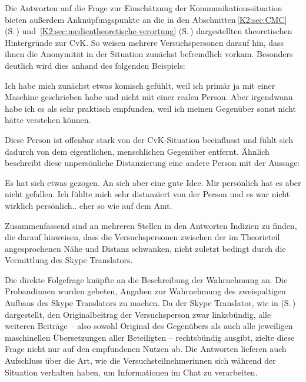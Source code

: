 Die Antworten auf die Frage zur Einschätzung der Kommunikationssituation bieten außerdem Anknüpfungspunkte an die in den Abschnitten\,\ref{K2:sec:CMC} (S.\,\pageref{K2:sec:CMC}) und~\ref{K2:sec:medientheoretische-verortung} (S.\,\pageref{K2:sec:medientheoretische-verortung}) dargestellten theoretischen Hintergründe zur CvK. So weisen mehrere Versuchspersonen darauf hin, dass ihnen die Anonymität in der Situation zunächst befremdlich vorkam. Besonders deutlich wird dies anhand des folgenden Beispiels: 

\begin{example}
	\label{K6:exp:CvK:maschine}
    Ich habe mich zunächst etwas komisch gefühlt, weil ich primär ja mit einer Maschine geschrieben habe und nicht mit einer realen Person. Aber irgendwann habe ich es als sehr praktisch empfunden, weil ich meinen Gegenüber sonst nicht hätte verstehen können.
\end{example}

Diese Person ist offenbar stark von der CvK-Situation beeinflusst und fühlt sich dadurch von dem eigentlichen, menschlichen Gegenüber entfernt. Ähnlich beschreibt diese unpersönliche Distanzierung eine andere Person mit der Aussage:

\begin{example}
\label{K6:exp:CvK:distanz}
       Es hat sich etwas gezogen. An sich aber eine gute Idee. Mir persönlich hat es aber nicht gefallen. Ich fühlte mich sehr distanziert von der Person und es war nicht wirklich persönlich.. eher so wie auf dem Amt.
\end{example}

Zusammenfassend sind an mehreren Stellen in den Antworten Indizien zu finden, die darauf hinweisen, dass die Versuchspersonen zwischen der im Theorieteil angesprochenen Nähe und Distanz schwanken, nicht zuletzt bedingt durch die Vermittlung des Skype Translators.
 
Die direkte Folgefrage knüpfte an die Beschreibung der Wahrnehmung an. Die Proband{\textperiodcentered}innen wurden gebeten, Angaben zur Wahrnehmung des zweispaltigen Aufbaus des Skype Translators zu machen. Da der Skype Translator, wie in  (S.\,\pageref{K3:fig:Ausschnitt-Ausgabe-MT-ST}) dargestellt, den Originalbeitrag der Versuchsperson zwar linksbündig, alle weiteren Beiträge -- also sowohl Original des Gegenübers als auch alle jeweiligen maschinellen Übersetzungen aller Beteiligten -- rechtsbündig ausgibt, zielte diese Frage nicht nur auf den empfundenen Nutzen ab. Die Antworten lieferen auch Aufschluss über die Art, wie die Versuchsteilnehmer{\textperiodcentered}innen sich während der Situation verhalten haben, um Informationen im Chat zu verarbeiten.

